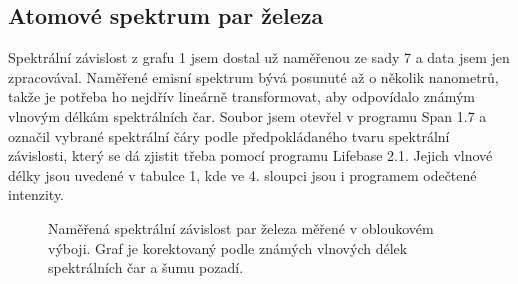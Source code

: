 \documentclass[a4paper,11pt]{article}
\begin{document}
\subsection{Atomové spektrum par železa}

Spektrální závislost z grafu 1 jsem dostal už naměřenou ze sady 7 a data jsem jen zpracovával. Naměřené emisní spektrum bývá posunuté až o několik nanometrů, takže je potřeba ho nejdřív lineárně transformovat, aby odpovídalo známým vlnovým délkám spektrálních čar. Soubor jsem otevřel v programu Span 1.7 a označil vybrané spektrální čáry podle předpokládaného tvaru spektrální závislosti, který se dá zjistit třeba pomocí programu Lifebase 2.1. Jejich vlnové délky jsou uvedené v tabulce 1, kde ve 4. sloupci jsou i programem odečtené intenzity. 

\begin{figure}[htpb]
    \centering
    \resizebox{0.8\textwidth}{!}{  }
    \vspace{40pt}
    \captionsetup{type=graph}
    \caption{Naměřená spektrální závislost par železa měřené v obloukovém výboji. Graf je korektovaný podle známých vlnových délek spektrálních čar a šumu pozadí.}
\end{figure}

\vspace{-20pt}
\end{document}
